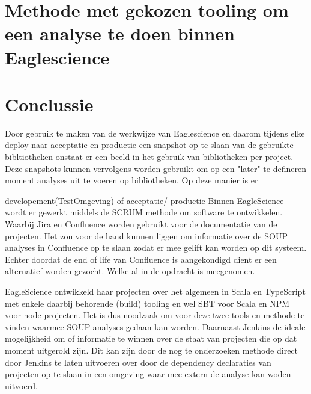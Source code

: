 \section{Methode met gekozen tooling om een analyse te doen binnen Eaglescience}\label{sec:methode}



\section{Conclussie}\label{sec:ESconclussie}
Door gebruik te maken van de werkwijze van Eaglescience en daarom tijdens elke deploy naar acceptatie en productie een snapshot op te slaan van de gebruikte bibltiotheken onstaat er een beeld in het gebruik van bibliotheken per project. Deze snapshots kunnen vervolgens worden gebruikt om op een "later" te defineren moment analyses uit te voeren op bibliotheken. Op deze manier is er


developement(TestOmgeving) of acceptatie/ productie
Binnen EagleScience wordt er gewerkt middels de SCRUM methode om software te ontwikkelen. Waarbij Jira en Confluence worden gebruikt voor de documentatie van de projecten. Het zou voor de hand kunnen liggen om informatie over de SOUP analyses in Confluence op te slaan zodat er mee gelift kan worden op dit systeem. Echter doordat de end of life van Confluence is aangekondigd dient er een alternatief worden gezocht. Welke al in de opdracht is meegenomen.

EagleScience ontwikkeld haar projecten over het algemeen in Scala en TypeScript met enkele daarbij behorende (build) tooling en wel SBT voor Scala en NPM voor node projecten. Het is dus noodzaak om voor deze twee tools en methode te vinden waarmee SOUP analyses gedaan kan worden. Daarnaast Jenkins de ideale mogelijkheid om of informatie te winnen over de staat van projecten die op dat moment uitgerold zijn. Dit kan zijn door de nog te onderzoeken methode direct door Jenkins te laten uitvoeren over door de dependency declaraties van projecten op te slaan in een omgeving waar mee extern de analyse kan woden uitvoerd.
